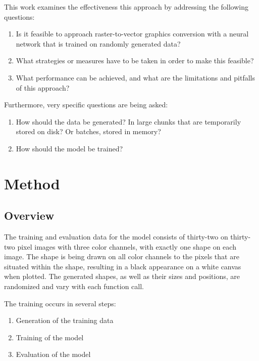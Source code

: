 \documentclass[12pt, a4paper, titlepage]{report}
\begin{document}
This work examines the effectiveness this approach by addressing the following questions:

\begin{enumerate}[label=\Roman*.]
   \item Is it feasible to approach raster-to-vector graphics conversion with a neural network that is trained on randomly generated data?
   \item What strategies or measures have to be taken in order to make this feasible?
   \item What performance can be achieved, and what are the limitations and pitfalls of this approach?
\end{enumerate}


Furthermore, very specific questions are being asked:

\begin{enumerate}[label=\Roman*.]
   \item How should the data be generated? In large chunks that are temporarily stored on disk? Or batches, stored in memory?
   \item How should the model be trained?
\end{enumerate}




\chapter{Method}

\section{Overview}

The training and evaluation data for the model consists of thirty-two on thirty-two pixel images with three color channels, with exactly one shape on each image. The shape is being drawn on all color channels to the pixels that are situated within the shape, resulting in a black appearance on a white canvas when plotted. The generated shapes, as well as their sizes and positions, are randomized and vary with each function call.

The training occurs in several steps:
\begin{enumerate}[label=\Roman*.]
   \item Generation of the training data
   \item Training of the model
   \item Evaluation of the model
\end{enumerate}
\end{document}
